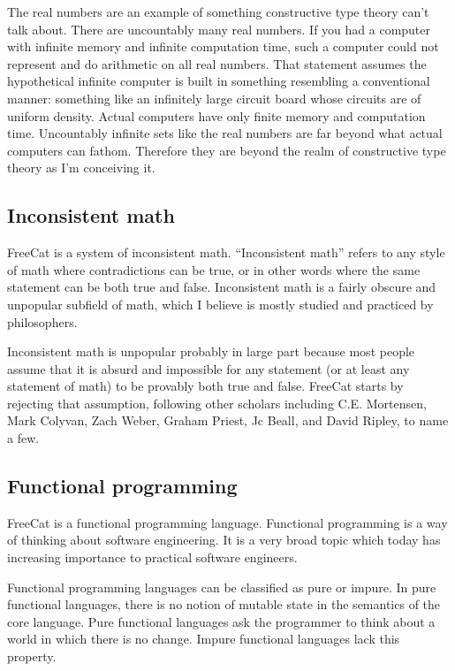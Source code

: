 \documentclass{article}
\begin{document}
The real numbers are an example of something constructive type theory can't talk about. There are uncountably many real numbers. If you had a computer with infinite memory and infinite computation time, such a computer could not represent and do arithmetic on all real numbers. That statement assumes the hypothetical infinite computer is built in something resembling a conventional manner: something like an infinitely large circuit board whose circuits are of uniform density. Actual computers have only finite memory and computation time. Uncountably infinite sets like the real numbers are far beyond what actual computers can fathom. Therefore they are beyond the realm of constructive type theory as I'm conceiving it.

\subsection{Inconsistent math}

FreeCat is a system of inconsistent math. ``Inconsistent math'' refers to any style of math where contradictions can be true, or in other words where the same statement can be both true and false. Inconsistent math is a fairly obscure and unpopular subfield of math, which I believe is mostly studied and practiced by philosophers.

Inconsistent math is unpopular probably in large part because most people assume that it is absurd and impossible for any statement (or at least any statement of math) to be provably both true and false. FreeCat starts by rejecting that assumption, following other scholars including C.E. Mortensen, Mark Colyvan, Zach Weber, Graham Priest, Jc Beall, and David Ripley, to name a few.

\subsection{Functional programming}

FreeCat is a functional programming language. Functional programming is a way of thinking about software engineering. It is a very broad topic which today has increasing importance to practical software engineers.

Functional programming languages can be classified as pure or impure. In pure functional languages, there is no notion of mutable state in the semantics of the core language. Pure functional languages ask the programmer to think about a world in which there is no change. Impure functional languages lack this property.
\end{document}

